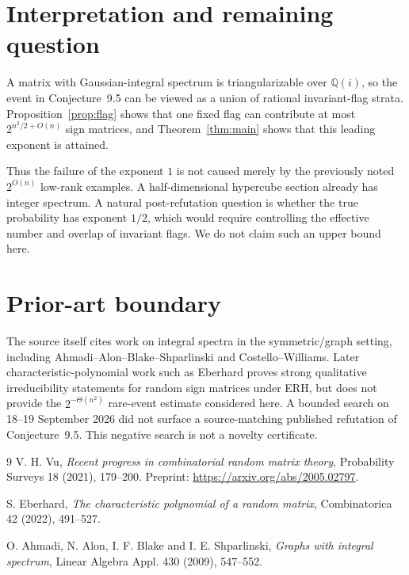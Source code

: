 \documentclass[11pt]{article}
\begin{document}
\section{Interpretation and remaining question}
A matrix with Gaussian-integral spectrum is triangularizable over $\mathbb Q(i)$, so the event in Conjecture~9.5 can be viewed as a union of rational invariant-flag strata.  Proposition~\ref{prop:flag} shows that one fixed flag can contribute at most $2^{n^2/2+O(n)}$ sign matrices, and Theorem~\ref{thm:main} shows that this leading exponent is attained.

Thus the failure of the exponent $1$ is not caused merely by the previously noted $2^{O(n)}$ low-rank examples.  A half-dimensional hypercube section already has integer spectrum.  A natural post-refutation question is whether the true probability has exponent $1/2$, which would require controlling the effective number and overlap of invariant flags.  We do not claim such an upper bound here.

\section{Prior-art boundary}
The source itself cites work on integral spectra in the symmetric/graph setting, including Ahmadi--Alon--Blake--Shparlinski and Costello--Williams.  Later characteristic-polynomial work such as Eberhard \cite{Eberhard2022} proves strong qualitative irreducibility statements for random sign matrices under ERH, but does not provide the $2^{-\Theta(n^2)}$ rare-event estimate considered here.  A bounded search on 18--19 September 2026 did not surface a source-matching published refutation of Conjecture~9.5.  This negative search is not a novelty certificate.

\begin{thebibliography}{9}
V. H. Vu,
\emph{Recent progress in combinatorial random matrix theory},
Probability Surveys 18 (2021), 179--200.
Preprint: \url{https://arxiv.org/abs/2005.02797}.

S. Eberhard,
\emph{The characteristic polynomial of a random matrix},
Combinatorica 42 (2022), 491--527.

O. Ahmadi, N. Alon, I. F. Blake and I. E. Shparlinski,
\emph{Graphs with integral spectrum},
Linear Algebra Appl. 430 (2009), 547--552.
\end{thebibliography}
\end{document}
